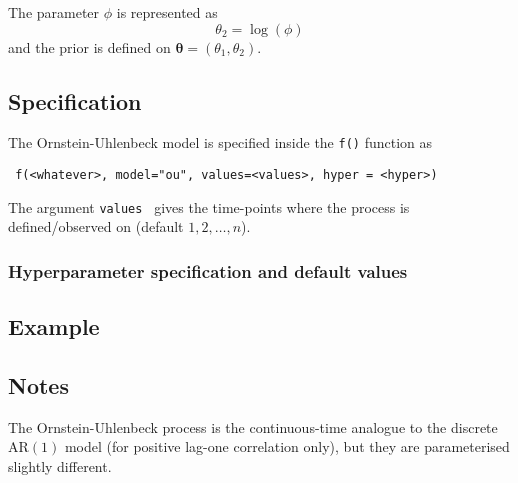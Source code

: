 \documentclass[a4paper,11pt]{article}
\begin{document}
The parameter $\phi$ is represented as
\begin{displaymath}
    \theta_{2} = \log( \phi )
\end{displaymath}
and the prior is defined on $\mathbf{\theta}=(\theta_1,\theta_2)$.

\subsection*{Specification}

The Ornstein-Uhlenbeck model is specified inside the {\tt f()}
function as
\begin{verbatim}
 f(<whatever>, model="ou", values=<values>, hyper = <hyper>)
\end{verbatim}
The argument {\tt values } gives the time-points where the process is
defined/observed on (default $1, 2, \ldots, n$).

\subsubsection*{Hyperparameter specification and default values}


\subsection*{Example}



\subsection*{Notes}

The Ornstein-Uhlenbeck process is the continuous-time analogue to the
discrete AR$(1)$ model (for positive lag-one correlation only), but
they are parameterised slightly different.
\end{document}
